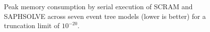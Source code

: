 \begin{figure}[h!]
  \centering
  
  \caption{Peak memory consumption by serial execution of SCRAM and SAPHSOLVE across seven event tree models (lower is better) for a truncation limit of $10^{-20}$.}
  \label{fig:memory_usage_1e-20}
\end{figure}